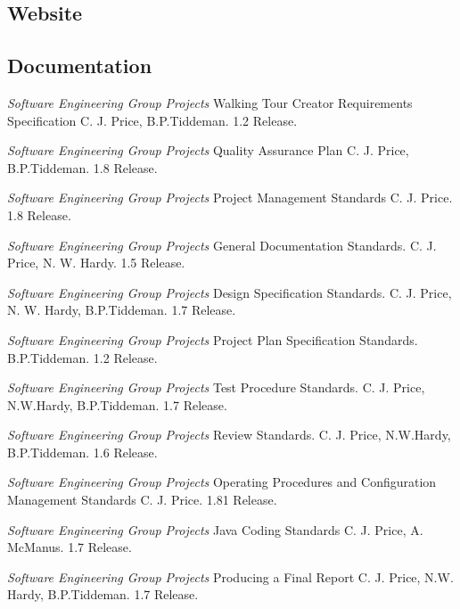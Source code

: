 \documentclass{project}
\begin{document}
\subsection{Website}

\subsection{Documentation}



\clearpage
{}
\begin{thebibliography}{5}

 \emph{Software Engineering Group Projects}
Walking Tour Creator Requirements Specification
C. J. Price, B.P.Tiddeman. 1.2 Release.

 \emph{Software Engineering Group Projects}
Quality Assurance Plan
C. J. Price, B.P.Tiddeman. 1.8 Release.

 \emph{Software Engineering Group Projects}
Project Management Standards
C. J. Price. 1.8 Release.

 \emph{Software Engineering Group Projects}
General Documentation Standards.
C. J. Price, N. W. Hardy. 1.5 Release.

 \emph{Software Engineering Group Projects}
Design Specification Standards.
C. J. Price, N. W. Hardy, B.P.Tiddeman. 1.7 Release.

 \emph{Software Engineering Group Projects}
Project Plan Specification Standards.
B.P.Tiddeman. 1.2 Release.

 \emph{Software Engineering Group Projects}
Test Procedure Standards.
C. J. Price, N.W.Hardy, B.P.Tiddeman. 1.7 Release.

 \emph{Software Engineering Group Projects}
Review Standards.
C. J. Price, N.W.Hardy, B.P.Tiddeman. 1.6 Release.

 \emph{Software Engineering Group Projects}
Operating Procedures and Configuration Management Standards
C. J. Price. 1.81 Release.

 \emph{Software Engineering Group Projects}
Java Coding Standards
C. J. Price, A. McManus. 1.7 Release.

 \emph{Software Engineering Group Projects}
Producing a Final Report
C. J. Price, N.W. Hardy, B.P.Tiddeman. 1.7 Release.

\end{thebibliography}
\end{document}
